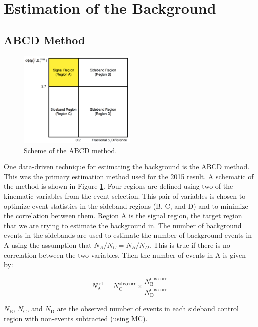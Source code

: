 \section{Estimation of the \Zjets Background}
\label{sec:zjets}

\subsection{ABCD Method}

\begin{figure}[htb]
\centering
\includegraphics[width=0.5\textwidth]{Figures/abcd2.png}
\caption{Scheme of the ABCD method.}
\label{fig:abcd}
\end{figure}

One data-driven technique for estimating the \Zjets background is the ABCD method. This was the primary estimation method used for the 2015 result. A schematic of the method is shown in Figure \ref{fig:abcd}. Four regions are defined using two of the kinematic variables from the event selection. This pair of variables is chosen to optimize event statistics in the sideband regions (B, C, and D) and to minimize the correlation between them. Region A is the signal region, the target region that we are trying to estimate the background in. The number of background events in the sidebands are used to estimate the number of background events in A using the assumption that $N_A/N_C = N_B/N_D$. This is true if there is no correlation between the two variables. Then the number of \Zjets events in A is given by:

\begin{equation}
N_\text{A}^\text{est} = N_\text{C}^\text{obs,corr} \times \frac{N_\text{B}^\text{obs,corr}}{N_\text{D}^\text{obs,corr}}
\end{equation}

\noindent $N_\text{B}$, $N_\text{C}$, and $N_\text{D}$ are the observed number of events in each sideband control region with non-\Zjets events subtracted (using MC).


